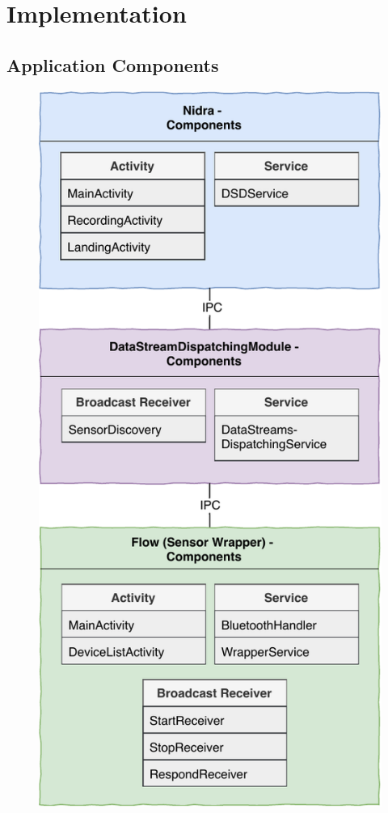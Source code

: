 \chapter{Implementation}

%

\section{Application Components}

\begin{figure}
    \centering
    \includegraphics[scale=0.95]{images/Android_Components.pdf}

\end{figure}

